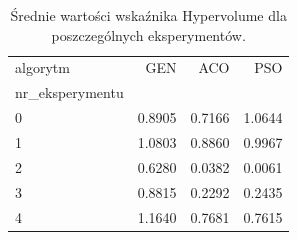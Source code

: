 \begin{table}
\caption{Średnie wartości wskaźnika Hypervolume dla poszczególnych eksperymentów.}
\label{tab:hv_srednie}
\begin{tabular}{lrrr}
\toprule
algorytm & GEN & ACO & PSO \\
nr_eksperymentu &  &  &  \\
\midrule
0 & 0.8905 & 0.7166 & 1.0644 \\
1 & 1.0803 & 0.8860 & 0.9967 \\
2 & 0.6280 & 0.0382 & 0.0061 \\
3 & 0.8815 & 0.2292 & 0.2435 \\
4 & 1.1640 & 0.7681 & 0.7615 \\
\bottomrule
\end{tabular}
\end{table}
